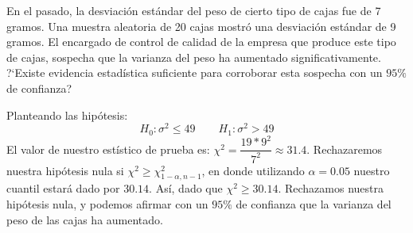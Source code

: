 \addpoints
\question[15] En el pasado, la desviaci\'on est\'andar del peso de cierto tipo de cajas fue de 7 gramos. Una muestra aleatoria de 20 cajas mostr\'o una desviaci\'on est\'andar de 9 gramos. El encargado de control de calidad de la empresa que produce este tipo de cajas, sospecha que la varianza del peso ha aumentado significativamente. ?`Existe evidencia estad\'istica suficiente para corroborar esta sospecha con un $95\%$ de confianza?

\begin{solution}

Planteando las hip\'otesis:$$H_0: \sigma^2\leq 49\hspace{25pt} H_1: \sigma^2 > 49 $$El valor de nuestro est\'istico de prueba es: $\chi^2=\dfrac{19*9^2}{7^2}\approx 31.4$. Rechazaremos nuestra hip\'otesis nula si $\chi^2\geq \chi_{1-\alpha,n-1}^{2}$, en donde utilizando $\alpha=0.05$ nuestro cuantil estar\'a dado por $30.14$. As\'i, dado que $\chi^2 \geq 30.14$. Rechazamos nuestra hip\'otesis nula, y podemos afirmar con un $95\%$ de confianza que la varianza del peso de las cajas ha aumentado.
\end{solution}
